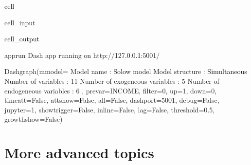 \documentclass[letterpaper,10pt,english]{jupyterBook}
\begin{document}
\begin{sphinxuseclass}{cell}\begin{sphinxVerbatimInput}

\begin{sphinxuseclass}{cell_input}
\begin{sphinxVerbatim}[commandchars=\\\{\}]
\end{sphinxVerbatim}

\end{sphinxuseclass}\end{sphinxVerbatimInput}
\begin{sphinxVerbatimOutput}

\begin{sphinxuseclass}{cell_output}
\begin{sphinxVerbatim}[commandchars=\\\{\}]
apprun
Dash app running on http://127.0.0.1:5001/
\end{sphinxVerbatim}

\begin{sphinxVerbatim}[commandchars=\\\{\}]
Dash\PYGZus{}graph(mmodel=\PYGZlt{}
Model name                              :          Solow model 
Model structure                         :         Simultaneous 
Number of variables                     :                   11 
Number of exogeneous  variables         :                    5 
Number of endogeneous variables         :                    6 
\PYGZgt{}, pre\PYGZus{}var=\PYGZsq{}INCOME\PYGZsq{}, filter=0, up=1, down=0, time\PYGZus{}att=False, attshow=False, all=False, dashport=5001, debug=False, jupyter=1, show\PYGZus{}trigger=False, inline=False, lag=False, threshold=0.5, growthshow=False)
\end{sphinxVerbatim}

\end{sphinxuseclass}\end{sphinxVerbatimOutput}

\end{sphinxuseclass}

\section{More advanced topics}
\label{\detokenize{content/notebooks/intro/Example Solow:more-advanced-topics}}
\end{document}
